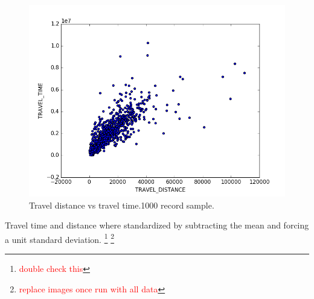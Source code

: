 \documentclass{article}
\newcommand{\selfnote}[1]{\footnote{\textcolor{red}{#1}}}
\begin{document}
\begin{figure}
  \centering
  \includegraphics[width=.8\linewidth]{./images/distance_vs_time.png}
  \caption{Travel distance vs travel time.1000 record sample.}
  \label{fig:preprocessing/distance_time_correlation}
\end{figure}

Travel time and distance where standardized by subtracting the mean and forcing a unit standard deviation. \selfnote{double check this} \selfnote{replace images once run with all data}
\end{document}

